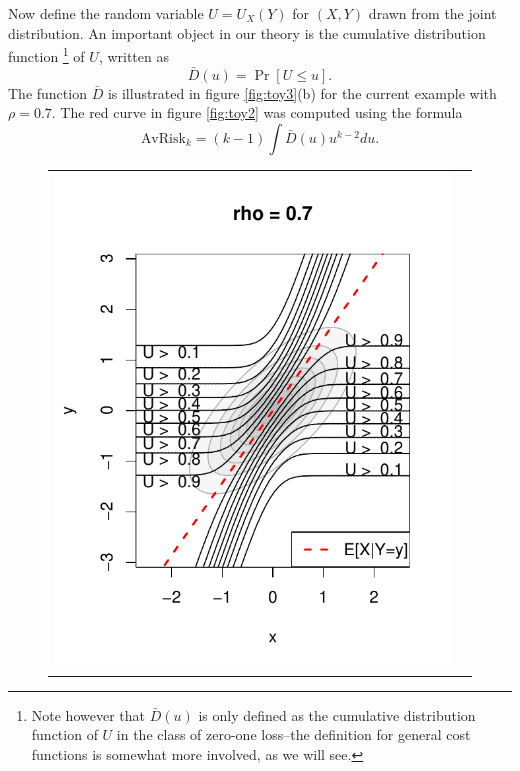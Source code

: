 \documentclass[12pt]{article}
\begin{document}
Now define the random variable $U = U_X(Y)$ for $(X, Y)$ drawn from
the joint distribution.  An important object in our theory is the
cumulative distribution function
\footnote{Note however that $\bar{D}(u)$ is only defined as the cumulative
distribution function of $U$ in the class of zero-one loss--the
definition for general cost functions is somewhat more involved, as we
will see.}
of $U$, written as
\[
\bar{D}(u) = \Pr[U \leq u].
\]
The function $\bar{D}$ is illustrated in
figure \ref{fig:toy3}(b) for the current example with $\rho = 0.7$.
The red curve in figure \ref{fig:toy2} was computed using the formula
\[
\text{AvRisk}_k = (k-1) \int \bar{D}(u) u^{k-2} du.
\]

\begin{figure}[h]
\centering
\begin{tabular}{cc}
\includegraphics[scale = 0.6, clip = true, trim = 0.1in 0 0 0.8in]{illus_ufunc_0_7.pdf} &

\end{tabular}
\end{figure}
\end{document}
